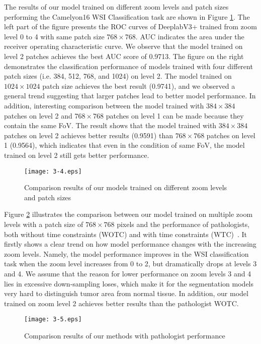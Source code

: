The results of our model trained on different zoom levels and patch sizes performing the Camelyon16 WSI Classification task are shown in Figure \ref{fig:3-4}. The left part of the figure presents the ROC curves of DeeplabV3+ trained from zoom level 0 to 4 with same patch size $768\times768$. AUC indicates the area under the receiver operating characteristic curve. We observe that the model trained on level 2 patches achieves the best AUC score of 0.9713. The figure on the right demonstrates the classification performance of models trained with four different patch sizes (i.e. 384, 512, 768, and 1024) on level 2. The model trained on $1024\times1024$ patch size achieves the best result (0.9741), and we observed a general trend suggesting that larger patches lead to better model performance. In addition, interesting comparison between the model trained with $384\times384$ patches on level 2 and $768\times768$ patches on level 1 can be made because they contain the same FoV. The result shows that the model trained with $384\times384$ patches on level 2 achieves better results (0.9591) than $768\times768$ patches on level 1 (0.9564), which indicates that even in the condition of same FoV, the model trained on level 2 still gets better performance. 

\begin{figure}[!h]
\centering
\texttt{[image: 3-4.eps]}
\caption{Comparison results of our models trained on different zoom levels
and patch sizes}
\label{fig:3-4}
\end{figure}

Figure \ref{fig:3-5} illustrates the comparison between our model trained on multiple zoom levels with a patch size of $768\times768$ pixels and the performance of pathologists, both without time constraints (WOTC) and with time constraints (WTC)~\cite{Bejnordi2017}. It firstly shows a clear trend on how model performance changes with the increasing zoom levels. Namely, the model performance improves in the WSI classification task when the zoom level increases from 0 to 2, but dramatically drops at levels 3 and 4. We assume that the reason for lower performance on zoom levels 3 and 4 lies in excessive down-sampling loses, which make it for the segmentation models very hard to distinguish tumor area from normal tissue. In addition, our model trained on zoom level 2 achieves better results than the pathologist WOTC.
\begin{figure}[!h]
\centering
\texttt{[image: 3-5.eps]}
\caption{Comparison results of our methods with pathologist performance}
\label{fig:3-5}
\end{figure}


